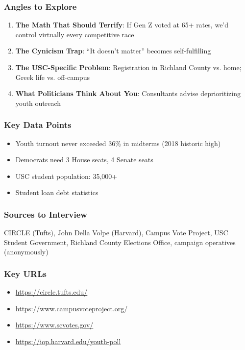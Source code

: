 \documentclass[11pt,letterpaper]{article}
\begin{document}
\subsubsection*{Angles to Explore}
\begin{enumerate}[noitemsep]
    \item \textbf{The Math That Should Terrify}: If Gen Z voted at 65+ rates, we'd control virtually every competitive race
    \item \textbf{The Cynicism Trap}: ``It doesn't matter'' becomes self-fulfilling
    \item \textbf{The USC-Specific Problem}: Registration in Richland County vs. home; Greek life vs. off-campus
    \item \textbf{What Politicians Think About You}: Consultants advise deprioritizing youth outreach
\end{enumerate}

\subsubsection*{Key Data Points}
\begin{itemize}[noitemsep]
    \item Youth turnout never exceeded 36\% in midterms (2018 historic high)
    \item Democrats need 3 House seats, 4 Senate seats
    \item USC student population: 35,000+
    \item Student loan debt statistics
\end{itemize}

\subsubsection*{Sources to Interview}
CIRCLE (Tufts), John Della Volpe (Harvard), Campus Vote Project, USC Student Government, Richland County Elections Office, campaign operatives (anonymously)

\subsubsection*{Key URLs}
\begin{itemize}[noitemsep]
    \item \url{https://circle.tufts.edu/}
    \item \url{https://www.campusvoteproject.org/}
    \item \url{https://www.scvotes.gov/}
    \item \url{https://iop.harvard.edu/youth-poll}
\end{itemize}
\end{document}
